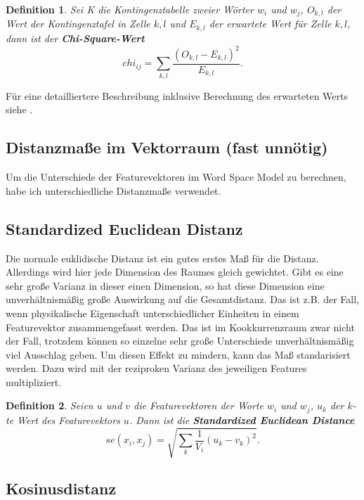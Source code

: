 \documentclass[11pt,numbers=noenddot]{scrartcl}
\newtheorem*{defi}{Definition}
\begin{document}
\begin{defi}
Sei K die Kontingenztabelle zweier Wörter $w_i$ und $w_j$, $O_{k,l}$ der Wert der Kontingenztafel in Zelle $k,l$ und $E_{k,l}$ der erwartete Wert für Zelle $k,l$, dann ist der \textbf{Chi-Square-Wert}
\begin{equation*}
   chi_{ij} = \sum_{k,l} { \frac{ (O_{k,l} - E_{k,l})^2} {E_{k,l}}  }.
\end{equation*}
\end{defi}

Für eine detailliertere Beschreibung inklusive Berechnung des erwarteten Werts siehe \citet[S. 169ff.]{manning1999}.

\subsection{Distanzmaße im Vektorraum (fast unnötig)}

Um die Unterschiede der Featurevektoren im Word Space Model zu berechnen, habe ich unterschiedliche Distanzmaße verwendet.

\subsection{Standardized Euclidean Distanz}

Die normale euklidische Distanz ist ein gutes erstes Maß für die Distanz. Allerdings wird hier jede Dimension des Raumes gleich gewichtet. Gibt es eine sehr große Varianz in dieser einen Dimension, so hat diese Dimension eine unverhältnismäßig große Auswirkung auf die Gesamtdistanz. Das ist z.B. der Fall, wenn physikalische Eigenschaft unterschiedlicher Einheiten in einem Featurevektor zusammengefasst werden. Das ist im Kookkurrenzraum zwar nicht der Fall, trotzdem können so einzelne sehr große Unterschiede unverhältnismäßig viel Ausschlag geben. Um diesen Effekt zu mindern, kann das Maß standarisiert werden. Dazu wird mit der reziproken Varianz des jeweiligen Features multipliziert.

\begin{defi}
Seien $u$ und $v$ die Featurevektoren der Worte $w_i$ und $w_j$, $u_k$ der $k$-te Wert des Featurevektors $u$. Dann ist die \textbf{Standardized Euclidean Distance}
$$
    se(x_i, x_j) = \sqrt{ \sum_{k} {\frac{1}{V_i}{ (u_k - v_k)^2 }} }.
$$

\end{defi}

\subsection{Kosinusdistanz}
\end{document}
